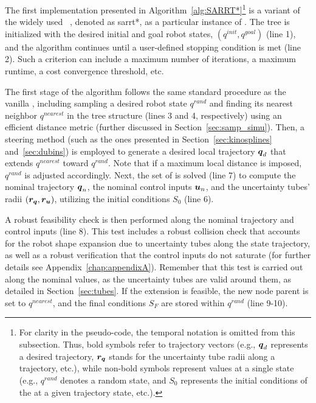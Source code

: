 
The first implementation presented in Algorithm~\ref{alg:SARRT*}\footnote{For clarity in the pseudo-code, the temporal notation is omitted from this subsection. 
Thus, bold symbols refer to trajectory vectors (e.g., $\boldsymbol{q}_d$ represents a desired trajectory, $\boldsymbol{r_q}$ stands for the uncertainty tube radii along a trajectory, etc.), while non-bold symbols represent values at a single state (e.g., $q^{rand}$ denotes a random state, and $S_0$ represents the initial conditions of the  at a given trajectory state, etc.).} is a variant of the widely used ~\cite{cRRTstar}, denoted as \gls{sarrt*}, as a particular instance of .
The tree is initialized with the desired initial and goal robot states, $(q^{init}, q^{goal})$ (line 1), and the algorithm continues until a user-defined stopping condition is met (line 2).
Such a criterion can include a maximum number of iterations, a maximum runtime, a cost convergence threshold, etc.

The first stage of the algorithm follows the same standard procedure as the vanilla , including sampling a desired robot state $q^{rand}$ and finding its nearest neighbor $q^{nearest}$ in the tree structure (lines 3 and 4, respectively) using an efficient distance metric (further discussed in Section~\ref{sec:samp_simu}).
Then, a steering method (such as the ones presented in Section~\ref{sec:kinosplines} and~\ref{sec:dubins}) is employed to generate a desired local trajectory $\boldsymbol{q}_d$ that extends $q^{nearest}$ toward $q^{rand}$.
Note that if a maximum local distance is imposed, $q^{rand}$ is adjusted accordingly.
Next, the set of  is solved (line 7) to compute the nominal trajectory $\boldsymbol{q}_n$, the nominal control inputs $\boldsymbol{u}_n$, and the uncertainty tubes' radii $(\boldsymbol{r_q}, \boldsymbol{r_u})$, utilizing the initial conditions $S_0$ (line 6).

A robust feasibility check is then performed along the nominal trajectory and control inputs (line 8).
This test includes a robust collision check that accounts for the robot shape expansion due to uncertainty tubes along the state trajectory, as well as a robust verification that the control inputs do not saturate (for further details see Appendix~\ref{chap:appendixA}).
Remember that this test is carried out along the nominal values, as the uncertainty tubes are valid around them, as detailed in Section~\ref{sec:tubes}.
If the extension is feasible, the new node parent is set to $q^{nearest}$, and the final conditions $S_F$ are stored within $q^{rand}$ (line 9-10).

